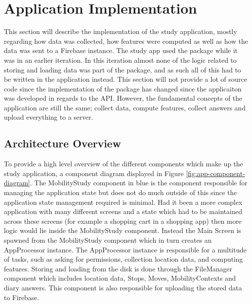 \section{Application Implementation}
This section will describe the implementation of the study application, mostly regarding how data was collected, how features were computed as well as how the data was sent to a Firebase instance. The study app used the package while it was in an earlier iteration. In this iteration almost none of the logic related to storing and loading data was part of the package, and as such all of this had to be written in the application instead. This section will not provide a lot of source code since the implementation of the package has changed since the applicaiton was developed in regards to the API. However, the fundamental concepts of the application are still the same; collect data, compute features, collect answers and upload everything to a server.

\subsection{Architecture Overview}
To provide a high level overview of the different components which make up the study application, a component diagram displayed in Figure \ref{fig:app-component-diagram}. The MobilityStudy component in blue is the component responsible for managing the application state but does not do much outside of this since the application state management required is minimal. Had it been a more complex application with many different screens and a state which had to be maintained across these screens (for example a shopping cart in a shopping app) then more logic would lie inside the MobilityStudy component. Instead the Main Screen is spawned from the MobilityStudy component which in turn creates an AppProcessor instance. The AppProcessor instance is responsible for a multitude of tasks, such as asking for permissions, collection location data, and computing features. Storing and loading from the disk is done through the FileManager component which includes location data, Stops, Moves, MobilityContexts and diary answers. This component is also responsible for uploading the stored data to Firebase.

